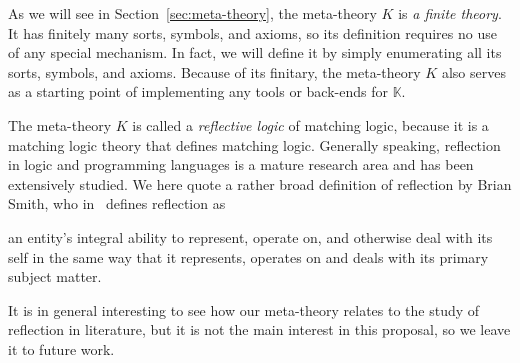\documentclass[UTF8,11pt]{article}
\theoremstyle{plain}
\theoremstyle{definition}
\theoremstyle{remark}
\newcommand{\K}{\mbox{$\mathbb{K}$}\xspace}
\begin{document}
As we will see in Section~\ref{sec:meta-theory}, the meta-theory $K$ is \emph{a 
finite theory}.
It has finitely many sorts, symbols, and axioms, so its definition requires no 
use of any special mechanism.
In fact, we will define it by simply enumerating all its sorts, symbols, 
and axioms.
Because of its finitary, the meta-theory $K$ also serves as a starting point of 
implementing any tools 
or back-ends for \K.

%
%

The meta-theory $K$ is called a \emph{reflective 
logic} of matching logic, because it is a matching logic theory that defines 
matching logic.
Generally speaking, reflection in logic and programming languages is a mature 
research area and has been extensively studied.
We here quote a rather broad definition of reflection by Brian Smith, who 
in~\cite{smith-1984-popl} defines reflection as
\begin{displayquote}
	an entity’s integral ability to represent, operate on,
	and otherwise deal with its self in the same way that
	it represents, operates on and deals with its primary
	subject matter.
\end{displayquote}
It is in general interesting to see how our meta-theory relates to the study of 
reflection in literature, but it is not the main interest in this proposal, so 
we leave it to future work.
\end{document}
